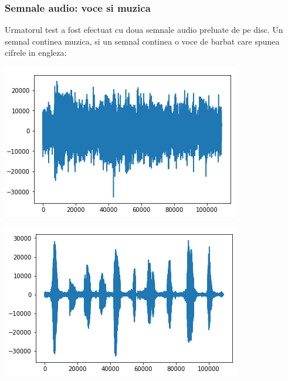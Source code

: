 \documentclass[12pt]{article}
\begin{document}
\subsubsection{Semnale audio: voce si muzica}
Urmatorul test a fost efectuat cu doua semnale audio preluate de pe disc. Un semnal continea muzica, si un semnal continea o voce de barbat care spunea cifrele in engleza:
\begin{center}
	\includegraphics[scale=1]{music_music}
\end{center}
\begin{center}
	\includegraphics[scale=1]{speech_music}
\end{center}
\end{document}
